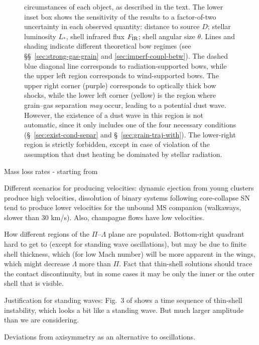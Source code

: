 \begin{figure}
{    circumstances of each object, as described in the text.  The lower
    inset box shows the sensitivity of the results to a factor-of-two
    uncertainty in each observed quantity: distance to source \(D\);
    stellar luminosity \(L_*\), shell infrared flux \(F_{\text{IR}}\); shell
    angular size \(\theta\).  Lines and shading indicate different
    theoretical bow regimes (see \S\S~\ref{sec:strong-gas-grain} and
    \ref{sec:imperf-coupl-betw}).  The dashed blue diagonal line
    corresponds to radiation-supported bows, while the upper left
    region corresponds to wind-supported bows.  The upper right corner
    (purple) corresponds to optically thick bow shocks, while the
    lower left corner (yellow) is the region where grain--gas
    separation \textit{may} occur, leading to a potential dust wave.
    However, the existence of a dust wave in this region is not
    automatic, since it only includes one of the four necessary
    conditions (\S~\ref{sec:exist-cond-separ} and
    \S~\ref{sec:grain-traj-with}). The lower-right region is strictly
    forbidden, except in case of violation of the assumption that dust
    heating be dominated by stellar radiation. }
  \label{fig:All-sources-eta-tau}
\end{figure}



Mass loss rates - starting from \citet{Kobulnicky:2010a}

Different scenarios for producing velocities: dynamic ejection from
young clusters \citep{Hoogerwerf:2001a, Oh:2016c} produce high
velocities, dissolution of binary systems following core-collapse SN
\citep{Renzo:2018a} tend to produce lower velocities for the unbound
MS companion (walkaways, slower than 30 km/s).  Also, champagne flows
have low velocities.

How different regions of the \(\Pi\)--\(\Lambda\) plane are populated.
Bottom-right quadrant hard to get to (except for standing wave
oscillations), but may be due to finite shell thickness, which (for
low Mach number) will be more apparent in the wings, which might
decrease \(\Lambda\) more than \(\Pi\).  Fact that thin-shell solutions should
trace the contact discontinuity, but in some cases it may be only the
inner or the outer shell that is visible.

Justification for standing waves: Fig.~3 of \citet{Meyer:2016a} shows
a time sequence of thin-shell instability, which looks a bit like a
standing wave. But much larger amplitude than we are considering.

Deviations from axisymmetry as an alternative to oscillations. 


